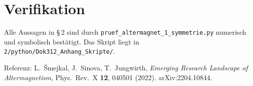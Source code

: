 \section{Verifikation}

Alle Aussagen in §\,2 sind durch \texttt{pruef\_altermagnet\_1\_symmetrie.py}
numerisch und symbolisch bestätigt. Das Skript liegt in
\texttt{2/python/Dok312\_Anhang\_Skripte/}.

Referenz: L.\ Šmejkal, J.\ Sinova, T.\ Jungwirth,
\textit{Emerging Research Landscape of Altermagnetism},
Phys.\ Rev.\ X \textbf{12}, 040501 (2022).
arXiv:2204.10844.
